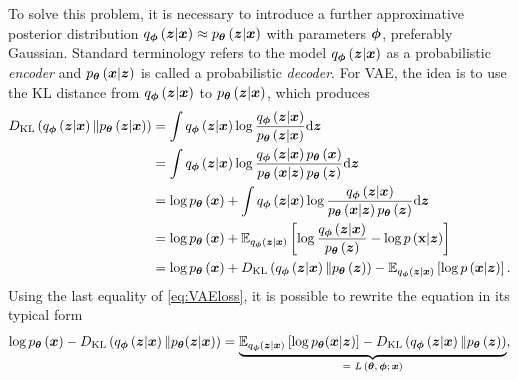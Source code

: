 To solve this problem, it is necessary to introduce a further approximative posterior distribution $q_{\boldsymbol{\phi}}\left(\boldsymbol{z}\vert\boldsymbol{x}\right) \approx p_{\boldsymbol{\theta}}\left(\boldsymbol{z}\vert\boldsymbol{x}\right)$ with parameters $\boldsymbol{\phi}$, preferably Gaussian. Standard terminology refers to the model $q_{\boldsymbol{\phi}}\left(\boldsymbol{z}\vert\boldsymbol{x}\right)$ as a probabilistic \emph{encoder} and  $p_{\boldsymbol{\theta}}\left(\boldsymbol{x}\vert \boldsymbol{z}\right)$ is called a probabilistic \emph{decoder}. For VAE, the idea is to use the KL distance from $q_{\boldsymbol{\phi}}\left(\boldsymbol{z}\vert\boldsymbol{x}\right)$ to $p_{\boldsymbol{\theta}}\left(\boldsymbol{z}\vert \boldsymbol{x}\right)$, which produces
\begin{equation}\label{eq:VAEloss}
\begin{split}
D_{\mathrm{KL}}\left(q_{\boldsymbol{\phi}}\left(\boldsymbol{z}\vert \boldsymbol{x} \right) \Vert p_{\boldsymbol{\theta}}\left(\boldsymbol{z}\vert \boldsymbol{x}\right)\right) & = 
\int q_{\boldsymbol{\phi}}\left(\boldsymbol{z}\vert \boldsymbol{x} \right) \log \frac{q_{\boldsymbol{\phi}}\left(\boldsymbol{z}\vert \boldsymbol{x} \right)}{p_{\boldsymbol{\theta}}\left(\boldsymbol{z}\vert \boldsymbol{x}\right)} \mathrm{d}{\boldsymbol{z}} \\
& =  \int q_{\boldsymbol{\phi}}\left(\boldsymbol{z}\vert \boldsymbol{x} \right) \log \frac{q_{\boldsymbol{\phi}}\left(\boldsymbol{z}\vert \boldsymbol{x} \right)p_{\boldsymbol{\theta}}\left(\boldsymbol{x}\right)}{p_{\boldsymbol{\theta}}\left(\boldsymbol{x} \vert \boldsymbol{z}\right) p_{\boldsymbol{\theta}}\left(\boldsymbol{z}\right)} \mathrm{d}{\boldsymbol{z}} \\
& = \log p_{\boldsymbol{\theta}}\left(\boldsymbol{x}\right) +  \int q_{\boldsymbol{\phi}}\left(\boldsymbol{z}\vert \boldsymbol{x} \right) \log \frac{q_{\boldsymbol{\phi}}\left(\boldsymbol{z}\vert \boldsymbol{x} \right)}{p_{\boldsymbol{\theta}}\left(\boldsymbol{x} \vert \boldsymbol{z}\right)p_{\boldsymbol{\theta}}\left(\boldsymbol{z}\right) } \mathrm{d}{\boldsymbol{z}} \\
& = \log p_{\boldsymbol{\theta}}\left(\boldsymbol{x}\right) +  \mathbb{E}_{q_{\boldsymbol{\phi}}\left(\boldsymbol{z}\vert \boldsymbol{x} \right)}\left[\log\frac{q_{\boldsymbol{\phi}}\left(\boldsymbol{z}\vert \boldsymbol{x} \right)}{p_{\boldsymbol{\theta}}\left(\boldsymbol{z}\right)} - \log p\left(\textbf{x}\vert \boldsymbol{z}\right)\right]\\
    & = \log p_{\boldsymbol{\theta}}\left(\boldsymbol{x}\right) +D_{\mathrm{KL}} \left(q_{\boldsymbol{\phi}}\left(\boldsymbol{z}\vert \boldsymbol{x} \right) \Vert p_{\boldsymbol{\theta}}\left(\boldsymbol{z}\right) \right) -  \mathbb{E}_{q_{\boldsymbol{\phi}}\left(\boldsymbol{z}\vert \boldsymbol{x} \right)}\left[\log p\left(\boldsymbol{x}\vert \boldsymbol{z}\right)\right].
 \end{split}
\end{equation}
Using the last equality of \eqref{eq:VAEloss}, it is possible to rewrite the equation in its typical form
\begin{equation}
\log p_{\boldsymbol{\theta}}\left(\boldsymbol{x}\right) - D_{\mathrm{KL}}\left(q_{\boldsymbol{\phi}}\left(\boldsymbol{z}\vert \boldsymbol{x} \right) \Vert p_{\boldsymbol{\theta}}(\boldsymbol{z}\vert \boldsymbol{x})\right) = \underbrace{\mathbb{E}_{q_{\boldsymbol{\phi}}\left(\boldsymbol{z}\vert \boldsymbol{x} \right)}\left[\log p_{\boldsymbol{\theta}}(\boldsymbol{x}\vert \boldsymbol{z}) \right] - D_{\mathrm{KL}}\left(q_{\boldsymbol{\phi}}\left(\boldsymbol{z}\vert\boldsymbol{x} \right) \Vert p_{\boldsymbol{\theta}}\left(\boldsymbol{z}\right)\right)}_{\text{= $L\left(\boldsymbol{\theta},\boldsymbol{\phi}; \boldsymbol{x}\right)$}},
\end{equation}
